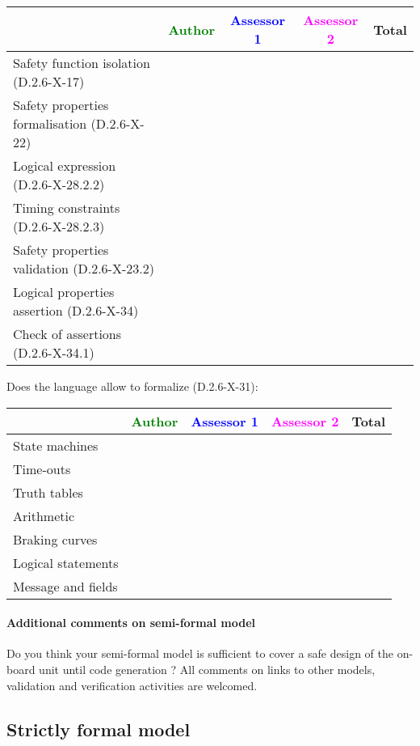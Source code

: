 \begin{tabular}{|l | c | c | c | c|}
\hline
& \textcolor{green}{Author} & \textcolor{blue}{Assessor 1} & \textcolor{magenta}{Assessor 2} & Total \\
\hline 
Safety function isolation (D.2.6-X-17)  & & & &  \\
\hline 
Safety properties formalisation (D.2.6-X-22)  & & & &  \\
\hline
Logical expression (D.2.6-X-28.2.2)  & & & &  \\
\hline
Timing constraints (D.2.6-X-28.2.3)  & & & &  \\
\hline
Safety properties validation (D.2.6-X-23.2)  & & & &  \\
\hline
Logical properties assertion (D.2.6-X-34)  & & & &  \\
\hline
Check  of assertions (D.2.6-X-34.1)  & & & &  \\
\hline
\end{tabular}

Does the language allow to  formalize (D.2.6-X-31):

\begin{tabular}{|l | c | c | c | c|}
\hline
& \textcolor{green}{Author} & \textcolor{blue}{Assessor 1} & \textcolor{magenta}{Assessor 2} & Total \\
\hline 
State machines  & & & &  \\
\hline
Time-outs  & & & &  \\
\hline
Truth tables  & & & &  \\
\hline
Arithmetic  & & & &  \\
\hline
Braking curves  & & & &  \\
\hline
Logical statements & & & &  \\
\hline
Message and fields & & & &  \\
\hline
\end{tabular}

\paragraph{Additional comments on semi-formal  model} Do you think your semi-formal  model is sufficient to cover a safe design of the on-board unit until code generation ?
All comments on links to  other models, validation and verification activities are welcomed.

\subsection{Strictly formal model}

